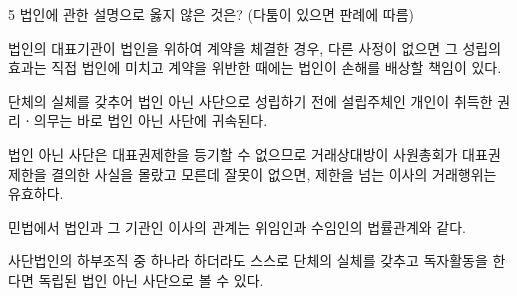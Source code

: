 \begin{question}{5}
법인에 관한 설명으로 옳지 않은 것은? (다툼이 있으면 판례에 따름)
\begin{choices}
  \item 법인의 대표기관이 법인을 위하여 계약을 체결한 경우, 다른 사정이 없으면 그 성립의 효과는 직접 법인에 미치고 계약을 위반한 때에는 법인이 손해를 배상할 책임이 있다.
  \item 단체의 실체를 갖추어 법인 아닌 사단으로 성립하기 전에 설립주체인 개인이 취득한 권리ㆍ의무는 바로 법인 아닌 사단에 귀속된다.
  \item 법인 아닌 사단은 대표권제한을 등기할 수 없으므로 거래상대방이 사원총회가 대표권제한을 결의한 사실을 몰랐고 모른데 잘못이 없으면, 제한을 넘는 이사의 거래행위는 유효하다.
  \item 민법에서 법인과 그 기관인 이사의 관계는 위임인과 수임인의 법률관계와 같다.
  \item 사단법인의 하부조직 중 하나라 하더라도 스스로 단체의 실체를 갖추고 독자활동을 한다면 독립된 법인 아닌 사단으로 볼 수 있다.
\end{choices}
\end{question}
